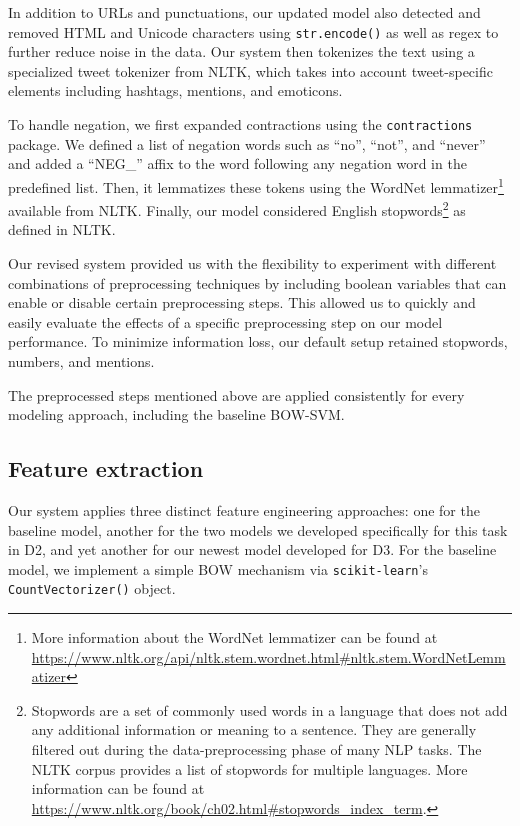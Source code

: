 \documentclass[11pt,a4paper]{article}
\begin{document}
In addition to URLs and punctuations, our updated model also detected and removed HTML and Unicode characters using \verb|str.encode()| as well as regex to further reduce noise in the data. Our system then tokenizes the text using a specialized tweet tokenizer from NLTK, which takes into account tweet-specific elements including hashtags, mentions, and emoticons. 

To handle negation, we first expanded contractions using the \verb|contractions| package. We defined a list of negation words such as “no”, “not”, and “never” and added a “NEG\_” affix to the word following any negation word in the predefined list. Then, it lemmatizes these tokens using the WordNet lemmatizer\footnote{More information about the WordNet lemmatizer can be found at \url{https://www.nltk.org/api/nltk.stem.wordnet.html\#nltk.stem.WordNetLemmatizer}} available from NLTK. Finally, our model considered English stopwords\footnote{Stopwords are a set of commonly used words in a language that does not add any additional information or meaning to a sentence. They are generally filtered out during the data-preprocessing phase of many NLP tasks. The NLTK corpus provides a list of stopwords for multiple languages. More information can be found at \url{https://www.nltk.org/book/ch02.html\#stopwords_index_term}.} as defined in NLTK.

Our revised system provided us with the flexibility to experiment with different combinations of preprocessing techniques by including boolean variables that can enable or disable certain preprocessing steps. This allowed us to quickly and easily evaluate the effects of a specific preprocessing step on our model performance. To minimize information loss, our default setup retained stopwords, numbers, and mentions.

The preprocessed steps mentioned above are applied consistently for every modeling approach, including the baseline BOW-SVM.



\subsection{Feature extraction}
Our system applies three distinct feature engineering approaches: one for the baseline model, another for the two models we developed specifically for this task in D2, and yet another for our newest model developed for D3. For the baseline model, we implement a simple BOW mechanism via \verb|scikit-learn|’s \verb|CountVectorizer()| object. 
\end{document}
